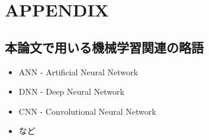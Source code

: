 \appendix
\chapter{APPENDIX}


\section{本論文で用いる機械学習関連の略語}


\begin{itemize}
    \item ANN - Artificial Neural Network
    \item DNN - Deep Neural Network
    \item CNN - Convolutional Neural Network
    \item など
\end{itemize}